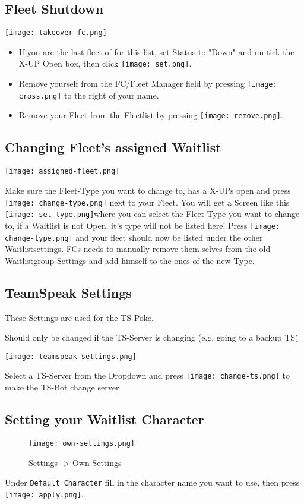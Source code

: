 \documentclass[oneside,a4paper]{article}
\newcommand{\piccross}{\texttt{[image: cross.png]}\xspace}
\newcommand{\picfleetsetting}{\texttt{[image: takeover-fc.png]}\xspace}
\newcommand{\picset}{\texttt{[image: set.png]}\xspace}
\newcommand{\picremove}{\texttt{[image: remove.png]}\xspace}
\newcommand{\picassignedfleet}{\texttt{[image: assigned-fleet.png]}}
\newcommand{\picchangetype}{\texttt{[image: change-type.png]}}
\newcommand{\picsettype}{\texttt{[image: set-type.png]}}
\newcommand{\picteamspeaksettings}{\texttt{[image: teamspeak-settings.png]}}
\newcommand{\picchangets}{\texttt{[image: change-ts.png]}}
\newcommand{\picownsettings}{\texttt{[image: own-settings.png]}}
\newcommand{\picapply}{\texttt{[image: apply.png]}}
\begin{document}
\subsection{Fleet Shutdown}
\picfleetsetting
\begin{itemize}
	\item If you are the last fleet of for this list, set Status to "Down" and un-tick the X-UP Open box, then click \picset.
	\item Remove yourself from the FC/Fleet Manager field by pressing \piccross to the right of your name.
	\item Remove your Fleet from the Fleetlist by pressing \picremove.
\end{itemize}

\subsection{Changing Fleet's assigned Waitlist}
\picassignedfleet



Make sure the Fleet-Type you want to change to, has a X-UPs open and press \picchangetype \xspace next to your Fleet.
You will get a Screen like this \picsettype where you can select the Fleet-Type you want to change to, if a Waitlist is not Open, it's type will not be listed here!
Press \picchangetype \xspace and your fleet should now be listed under the other Waitlistsettings.
FCs needs to manually remove them selves from the old Waitlistgroup-Settings and add himself to the ones of the new Type.

\subsection{TeamSpeak Settings}
These Settings are used for the TS-Poke.

Should only be changed if the TS-Server is changing (e.g. going to a backup TS)


\picteamspeaksettings

Select a TS-Server from the Dropdown and press \picchangets \xspace to make the TS-Bot change server 


\subsection{Setting your Waitlist Character}
\begin{figure}[H]
	\caption{Settings -\textgreater \xspace Own Settings}
	\picownsettings
\end{figure}
Under \texttt{Default Character} fill in the character name you want to use, then press \picapply .
\end{document}
